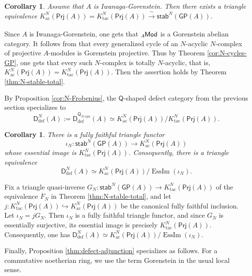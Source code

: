 \documentclass{amsart}
\theoremstyle{bfupright head,slanted body}
\theoremstyle{bfupright head,upright body}
\theoremstyle{fixed bf head,slanted body}
\newtheorem{cor}[res]{Corollary}        \newtheorem*{cor*}{Corollary}
\theoremstyle{fixed bf head,upright body}
\theoremstyle{numbered paragraph}
\newenvironment{prf*}[1][Proof]{%
	\begin{proof}[\bf #1]
		\setcounter{equation}{0}
		\renewcommand{\theequation}{\arabic{equation}}}
	{\end{proof}
}
\numberwithin{equation}{res}
\newcommand{\GP}[1]{\mathsf{GP}(#1)}
\newcommand{\Prj}[1]{\mathsf{Prj}(#1)}
\newcommand{\xra}[2][]{\xrightarrow[#1]{\:#2\:}}
\newcommand{\Q}{\mathsf{Q}}
\newcommand{\lMod}[1]{{}_{#1}\mspace{-1mu}{\sf{Mod}}}
\begin{document}
\begin{cor}\label{cor:BM-recovery}
Assume that $A$ is Iwanaga-Gorenstein. Then there exists a triangle equivalence
$K^N_{\mathrm{ac}}(\Prj A)=K^N_{\mathrm{tac}}(\Prj A)\xra{\sim}\mathsf{stab}^N(\GP{A}).$
\end{cor}

\begin{prf*}
Since $A$ is Iwanaga-Gorenstein, one gets that $\lMod{A}$ is a Gorenstein abelian category. It follows from \cite[Proposition 4.1]{BM24} that every generalized cycle of an $N$-acyclic $N$-complex of projective $A$-modules is Gorenstein projective. Thus by Theorem \ref{cor:N-cycles-GP}, one gets that every such $N$-complex is totally $N$-acyclic, that is, $K^N_{\mathrm{ac}}(\Prj A)=K^N_{\mathrm{tac}}(\Prj A)$. Then the assertion holds by Theorem \ref{thm:N-stable-total}.
\end{prf*}

By Proposition \ref{cor:N-Frobenius}, the $\Q$-shaped defect category from the previous section specializes to
$$\mathsf D_{\mathrm{def}}^{N}(A)
:=\mathsf D_{\mathrm{def}}^{\Q_{N\text{-}\mathrm{cpx}}}(A)
\simeq K^N_{\mathrm{ac}}(\Prj A)\big/K^N_{\mathrm{tac}}(\Prj A).$$

\begin{cor}\label{cor:N-defect-Nstable}
There is a fully faithful triangle functor
$$\iota_N: \mathsf{stab}^N(\GP{A}) \to K^N_{\mathrm{ac}}(\Prj A)$$
whose essential image is $K^N_{\mathrm{tac}}(\Prj A)$. Consequently, there is a triangle equivalence
$$\mathsf D_{\mathrm{def}}^{N}(A) \simeq K^N_{\mathrm{ac}}(\Prj A)\big/\operatorname{EssIm}(\iota_N).$$
\end{cor}

\begin{prf*}
Fix a triangle quasi-inverse $G_N: \mathsf{stab}^N(\GP A) \to K^N_{\mathrm{tac}}(\Prj A)$ of the equivalence $\overline F_N$ in Theorem \ref{thm:N-stable-total}, and let $j: K^N_{\mathrm{tac}}(\Prj A) \hookrightarrow K^N_{\mathrm{ac}}(\Prj A)$
be the canonical fully faithful inclusion. Let $\iota_N=jG_N$. Then $\iota_N$ is a fully faithful triangle functor, and since $G_N$ is essentially surjective, its essential image is precisely $K^N_{\mathrm{tac}}(\Prj A)$. Consequently, one has $\mathsf D_{\mathrm{def}}^{N}(A)\simeq K^N_{\mathrm{ac}}(\Prj A)\big/\operatorname{EssIm}(\iota_N)$.
\end{prf*}

Finally, Proposition \ref{thm:defect-adjunction} specializes as follows. For a commutative noetherian ring, we use the term Gorenstein in the usual local sense.
\end{document}
